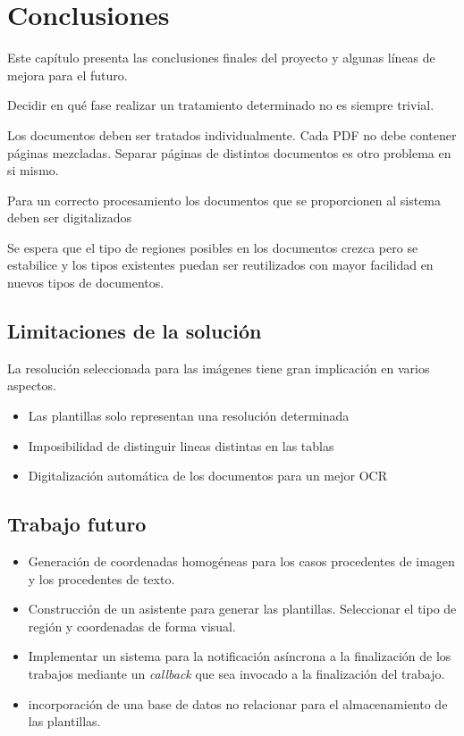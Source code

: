 
\chapter{Conclusiones}
\label{chap:conclusiones}

Este capítulo presenta las conclusiones finales del proyecto y algunas líneas de mejora para el futuro.

Decidir en qué fase realizar un tratamiento determinado no es siempre trivial.

Los documentos deben ser tratados individualmente. Cada PDF no debe contener páginas mezcladas. Separar páginas de distintos documentos es otro problema en si mismo.

Para un correcto procesamiento los documentos que se proporcionen 
al sistema deben ser digitalizados 

Se espera que el tipo de regiones posibles en los documentos crezca pero se estabilice y los tipos existentes puedan ser reutilizados con mayor facilidad en nuevos tipos de documentos.

\section{Limitaciones de la solución}
La resolución seleccionada para las imágenes tiene gran implicación en varios aspectos.
\begin{itemize}
    \item Las plantillas solo representan una resolución determinada
    \item Imposibilidad de distinguir lineas distintas en las tablas
    \item Digitalización automática de los documentos para un mejor OCR
\end{itemize}

\section{Trabajo futuro}

\begin{itemize}
    \item Generación de coordenadas homogéneas para los casos procedentes de imagen y los procedentes de texto.
    \item Construcción de un asistente para generar las plantillas. Seleccionar el tipo de región y coordenadas de forma visual.
    \item Implementar un sistema para la notificación asíncrona a la finalización de los trabajos mediante un \emph{callback} que sea invocado a la finalización del trabajo.
    \item incorporación de una base de datos no relacionar para el almacenamiento de las plantillas.
\end{itemize}

